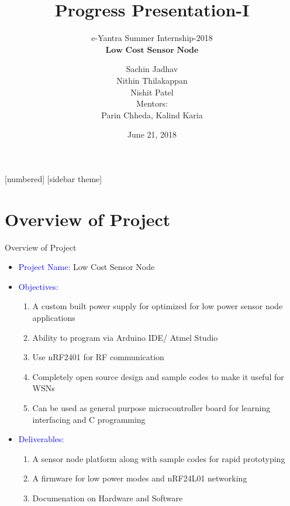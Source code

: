 \documentclass[10pt, a4paper]{beamer}
\begin{document}
	\title{Progress Presentation-I}
	\subtitle{e-Yantra Summer Internship-2018 \\ $ \textbf{Low Cost Sensor Node} $}
	\author{Sachin Jadhav\\Nithin Thilakappan\\Nishit Patel\\ \vspace{1em}
	Mentors: \\ Parin Chheda, Kalind Karia}
	\date{June 21, 2018}
	\frame{\titlepage}

[numbered]
[sidebar theme]
\section{Overview of Project}
\begin{frame}{Overview of Project}
	\begin{itemize}
		\item \textcolor{blue}{Project Name:} Low Cost Sensor Node
		\item \textcolor{blue}{Objectives:}
        	\begin{enumerate}
        		\item A custom built power supply for optimized for low power sensor node applications
				\item Ability to program via Arduino IDE/ Atmel Studio
				\item Use nRF2401 for RF communication
				\item Completely open source design and sample codes to make it useful for WSNs
				\item Can be used as general purpose microcontroller board for learning interfacing and C
programming
                \end{enumerate}
		\item \textcolor{blue}{Deliverables:}
        \begin{enumerate}
        		\item A sensor node platform along with sample codes for rapid prototyping
				\item A firmware for low power modes and nRF24L01 networking
				\item Documenation on Hardware and Software
			
                \end{enumerate} 
	\end{itemize}
\end{frame}
\end{document}

